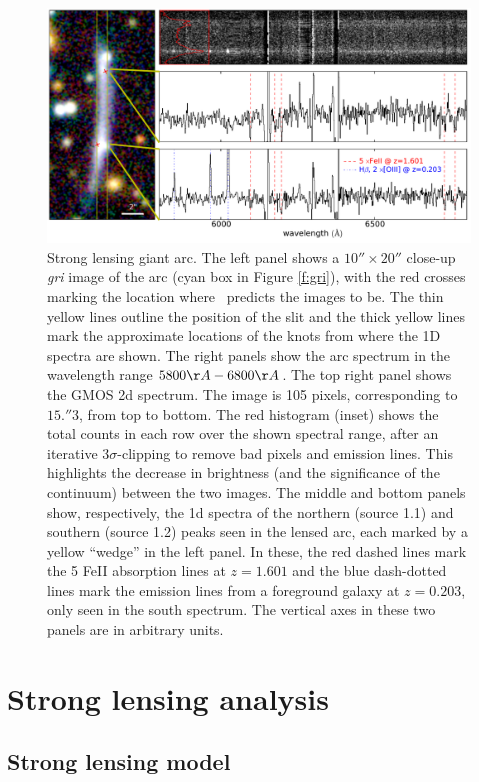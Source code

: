 \begin{figure}
\centerline{\includegraphics[width=\textwidth]{chapter2/giantarc.pdf}}
\caption{Strong lensing giant arc. The left panel shows a $10''\times20''$ close-up {\it 
gri} image 
of the arc (cyan box in Figure \ref{f:gri}), with the red crosses marking the location where 
\lenstool\ predicts the images to be. The thin yellow lines outline the position of the slit and 
the thick yellow lines mark the approximate locations of the knots from where the 1D spectra are 
shown. The right panels show the arc spectrum in the wavelength range $5800\AA-6800\AA$. The top 
right panel shows the GMOS 2d spectrum. The image is 105 pixels, corresponding to $15.\!''3$, 
from top to bottom. The red histogram (inset) shows the total counts in each row over the shown 
spectral range, after an iterative $3\sigma$-clipping to remove bad pixels and emission lines. This 
highlights the decrease in brightness (and the significance of the continuum) between the two 
images. The middle and bottom panels show, respectively, the 1d spectra of the northern (source 1.1) 
and southern (source 1.2) peaks seen in the lensed arc, each marked by a yellow ``wedge'' in the 
left panel. In these, the red dashed lines mark the 5 FeII absorption lines at $z=1.601$ and the 
blue dash-dotted lines mark the emission lines from a foreground galaxy at $z=0.203$, only seen in 
the south spectrum. The vertical axes in these two panels are in arbitrary units.}
\label{f:arc}
\end{figure}


\section{Strong lensing analysis}\label{s:sl}

\subsection{Strong lensing model}


